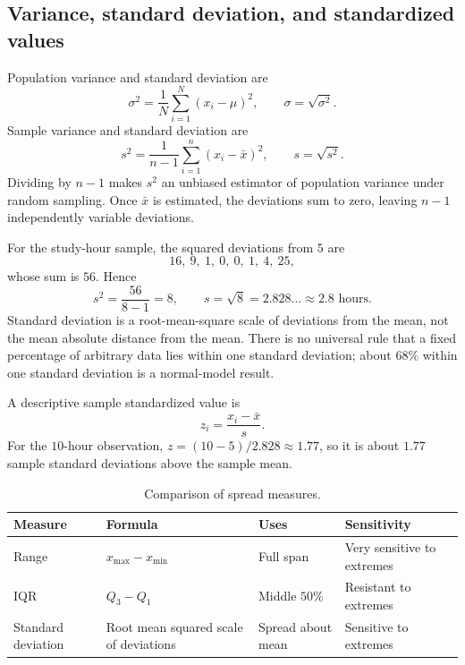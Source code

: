 \documentclass[11pt]{article}
\begin{document}
\subsection{Variance, standard deviation, and standardized values}
Population variance and standard deviation are
\begin{equation}\label{eq:pop-sd}
 \sigma^2=\frac{1}{N}\sum_{i=1}^{N}(x_i-\mu)^2,
 \qquad \sigma=\sqrt{\sigma^2}.
\end{equation}
Sample variance and standard deviation are
\begin{equation}\label{eq:samp-sd}
 s^2=\frac{1}{n-1}\sum_{i=1}^{n}(x_i-\bar{x})^2,
 \qquad s=\sqrt{s^2}.
\end{equation}
Dividing by $n-1$ makes $s^2$ an unbiased estimator of population variance
under random sampling.  Once $\bar{x}$ is estimated, the deviations sum to
zero, leaving $n-1$ independently variable deviations.

For the study-hour sample, the squared deviations from $5$ are
\[
16,\ 9,\ 1,\ 0,\ 0,\ 1,\ 4,\ 25,
\]
whose sum is $56$.  Hence
\[
s^2=\frac{56}{8-1}=8,
\qquad s=\sqrt{8}=2.828\ldots\approx2.8\text{ hours}.
\]
Standard deviation is a root-mean-square scale of deviations from the mean,
not the mean absolute distance from the mean.  There is no universal rule
that a fixed percentage of arbitrary data lies within one standard deviation;
about $68\%$ within one standard deviation is a normal-model result.

A descriptive sample standardized value is
\begin{equation}\label{eq:sample-z}
z_i=\frac{x_i-\bar{x}}{s}.
\end{equation}
For the $10$-hour observation, $z=(10-5)/2.828\approx1.77$, so it is about
$1.77$ sample standard deviations above the sample mean.

\begin{table}[ht]
\centering
\caption{Comparison of spread measures.}
\begin{tabularx}{\textwidth}{@{}lYYY@{}}
\toprule
Measure & Formula & Uses & Sensitivity \\
\midrule
Range & $x_{\max}-x_{\min}$ & Full span & Very sensitive to extremes \\
IQR & $Q_3-Q_1$ & Middle $50\%$ & Resistant to extremes \\
Standard deviation & Root mean squared scale of deviations & Spread about mean & Sensitive to extremes \\
\bottomrule
\end{tabularx}
\end{table}
\end{document}
